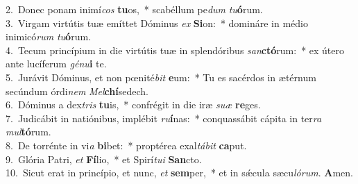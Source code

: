 {2.~}Donec ponam inimí\textit{cos} \textbf{tu}os,~* scabéllum pe\textit{dum} \textit{tu}\textbf{ó}rum.\\
{3.~}Virgam virtútis tuæ emíttet Dóminus \textit{ex} \textbf{Si}on:~* domináre in médio inimicó\textit{rum} \textit{tu}\textbf{ó}rum.\\
{4.~}Tecum princípium in die virtútis tuæ in splendóribus \textit{san}\textbf{ctó}rum:~* ex útero ante lucíferum \textit{gé}\textit{nu}\textbf{i} te.\\
{5.~}Jurávit Dóminus, et non pœnité\textit{bit} \textbf{e}um:~* Tu es sacérdos in ætérnum secúndum órdi\textit{nem} \textit{Mel}\textbf{chí}sedech.\\
{6.~}Dóminus a dex\textit{tris} \textbf{tu}is,~* confrégit in die iræ \textit{su}\textit{æ} \textbf{re}ges.\\
{7.~}Judicábit in natiónibus, implébit \textit{ru}\textbf{í}nas:~* conquassábit cápita in ter\textit{ra} \textit{mul}\textbf{tó}rum.\\
{8.~}De torrénte in vi\textit{a} \textbf{bi}bet:~* proptérea exal\textit{tá}\textit{bit} \textbf{ca}put.\\
{9.~}Glória Patri, \textit{et} \textbf{Fí}lio,~* et Spirí\textit{tu}\textit{i} \textbf{San}cto.\\
{10.~}Sicut erat in princípio, et nunc, \textit{et} \textbf{sem}per,~* et in sǽcula sæcu\textit{ló}\textit{rum}. \textbf{A}men.\\
